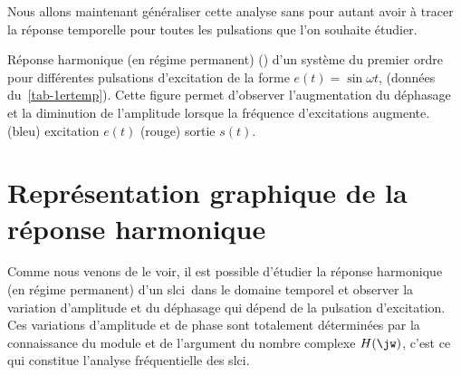 Nous allons maintenant généraliser cette analyse sans pour autant avoir à 
tracer la réponse temporelle pour toutes les pulsations que l'on souhaite 
étudier.
\begin{marginfigure}[-20em]
    \centering
    \resizebox{\linewidth}{!}{}
    \resizebox{\linewidth}{!}{}
    \resizebox{\linewidth}{!}{}
    \caption{Réponse harmonique (en régime permanent) () d'un 
             système du premier ordre pour différentes pulsations d'excitation 
             de la forme $e(t)=\sin{\omega t}$, (données du~\cref{tab-1ertemp}).
             Cette figure permet d'observer l'augmentation du déphasage et la 
             diminution de l'amplitude lorsque la fréquence d'excitations 
             augmente. (bleu) excitation $e(t)$ (rouge) sortie $s(t)$.
             \label{fig-repham}}
\end{marginfigure}
\newpage
\section[Représentation graphique]{Représentation graphique de 
la réponse harmonique}
Comme nous venons de le voir, il est possible d'étudier
la réponse harmonique (en régime permanent) d'un \gls{slci}~dans le domaine 
temporel et observer la variation d'amplitude et du 
déphasage qui dépend de la pulsation d'excitation. Ces variations 
d'amplitude et de phase sont totalement déterminées par la 
connaissance du module et de l'argument du nombre complexe $H(\jw)$, 
c'est ce qui constitue l'analyse fréquentielle des \gls{slci}.

